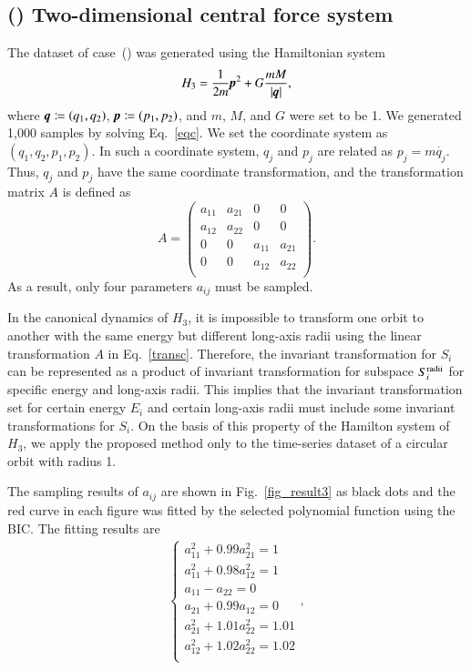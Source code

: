 \documentclass[preprint,
bibnotes,
 amsmath,amssymb,
 aps,
]{revtex4-1}
\newcounter{num}
\newcommand{\rnum}[1]{\setcounter{num}{#1}\roman{num}}
\begin{document}
\subsection*{(\rnum{3}) Two-dimensional central force system}
The dataset of case~(\rnum{3}) was generated using the Hamiltonian system
\begin{eqnarray}
\label{eqc}
H_3 = \frac{1}{2m} {\textit{\textbf{p}}}^2 + G\frac{mM}{\left|{\textit{\textbf{q}}}\right|},
\end{eqnarray}
where ${\textit{\textbf{q}}}\coloneqq(q_1,q_2)$, ${\textit{\textbf{p}}}\coloneqq(p_1,p_2)$, and $m$, $M$, and $G$ were set to be 1. 
We generated 1,000 samples by solving Eq.~\eqref{eqc}. 
We set the coordinate system as $(q_1,q_2,p_1,p_2)$. 
In such a coordinate system, $q_j$ and $p_j$ are related as $p_j = m\dot{q_j}$. Thus, $q_j$ and $p_j$ have the same coordinate transformation, and the transformation matrix $A$ is defined as
\begin{equation}
\label{transc}
A  =
  \left(
    \begin{array}{cccc}
      a_{11} & a_{21} & 0 & 0\\
      a_{12} & a_{22} & 0 & 0 \\
      0 & 0 & a_{11} & a_{21}\\
      0 & 0 & a_{12} & a_{22}\\
    \end{array}
  \right). 
\end{equation}
As a result, only four parameters $a_{ij}$ must be sampled.\par
In the canonical dynamics of $H_3$, it is impossible to transform one orbit to another with the same energy but different long-axis radii using the linear transformation $A$ in Eq.~\eqref{transc}. 
Therefore, the invariant transformation for $S_i$ can be represented as a product of invariant transformation for subspace $S_i^{{\rm radii}}$ for specific energy and long-axis radii. 
This implies that the invariant transformation set for certain energy $E_i$ and certain long-axis radii must include some invariant transformations for $S_i$. 
On the basis of this property of the Hamilton system of $H_3$, we apply the proposed method only to the time-series dataset of a circular orbit with radius 1.\par
The sampling results of $a_{ij}$ are shown in Fig.~\ref{fig_result3} as black dots and the red curve in each figure was fitted by the selected polynomial function using the BIC. 
The fitting results are 
\begin{eqnarray}
  \begin{cases}
a_{11}^2 + 0.99a_{21}^2 = 1\\
a_{11}^2 + 0.98a_{12}^2 = 1\\
a_{11} - a_{22} = 0\\
a_{21} + 0.99a_{12} = 0\\
a_{21}^2 + 1.01a_{22}^2 = 1.01\\
a_{12}^2 + 1.02a_{22}^2 = 1.02\\
\end{cases},
\end{eqnarray}
\end{document}
